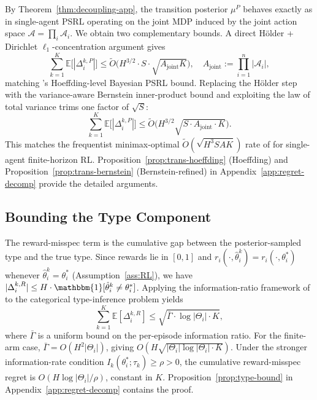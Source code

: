 By Theorem~\ref{thm:decoupling-app}, the transition posterior $\mu^P$ behaves exactly as in single-agent PSRL operating on the joint MDP induced by the joint action space $\mathcal{A} = \prod_i \mathcal{A}_i$. We obtain two complementary bounds. A direct Hölder + Dirichlet $\ell_1$-concentration argument gives
\begin{equation}
\sum_{k=1}^K \mathbb{E}\big[|\Delta_i^{k,P}|\big] \leq \tilde{O}\Big(H^{3/2} \cdot S \cdot \sqrt{A_{\mathrm{joint}} K}\Big), \quad A_{\mathrm{joint}} := \prod_{i=1}^n |\mathcal{A}_i|,
\end{equation}
matching \citet{osband2013more}'s Hoeffding-level Bayesian PSRL bound. Replacing the Hölder step with the variance-aware Bernstein inner-product bound \citep{azar2017minimax,lu2019information} and exploiting the law of total variance trims one factor of $\sqrt{S}$:
\begin{equation}
\sum_{k=1}^K \mathbb{E}\big[|\Delta_i^{k,P}|\big] \leq \tilde{O}\Big(H^{3/2}\sqrt{S \cdot A_{\mathrm{joint}} \cdot K}\Big).
\end{equation}
This matches the frequentist minimax-optimal $\tilde{O}(\sqrt{H^3SAK})$ rate of \citet{azar2017minimax} for single-agent finite-horizon RL. Proposition~\ref{prop:trans-hoeffding} (Hoeffding) and Proposition~\ref{prop:trans-bernstein} (Bernstein-refined) in Appendix~\ref{app:regret-decomp} provide the detailed arguments.

\subsection{Bounding the Type Component}

The reward-misspec term is the cumulative gap between the posterior-sampled type and the true type. Since rewards lie in $[0, 1]$ and $r_i(\cdot, \hat{\theta}_i^k) = r_i(\cdot, \theta_i^*)$ whenever $\hat{\theta}_i^k = \theta_i^*$ (Assumption~\ref{ass:RL}), we have $|\Delta_i^{k,R}| \leq H \cdot \mathbbm{1}[\hat{\theta}_i^k \neq \theta_i^*]$. Applying the information-ratio framework of \citet{russo2016information} to the categorical type-inference problem yields
\begin{equation}
\sum_{k=1}^K \mathbb{E}[\Delta_i^{k,R}] \leq \sqrt{\bar{\Gamma} \cdot \log|\Theta_i| \cdot K},
\end{equation}
where $\bar{\Gamma}$ is a uniform bound on the per-episode information ratio. For the finite-arm case, $\bar{\Gamma} = O(H^2 |\Theta_i|)$, giving $O(H\sqrt{|\Theta_i| \log|\Theta_i| \cdot K})$. Under the stronger information-rate condition $I_k(\theta_i^*; \tau_k) \geq \rho > 0$, the cumulative reward-misspec regret is $O(H \log|\Theta_i| / \rho)$, constant in $K$. Proposition~\ref{prop:type-bound} in Appendix~\ref{app:regret-decomp} contains the proof.


